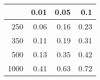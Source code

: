 % 
\begin{tabular}{rrrr}
  \hline
 & 0.01 & 0.05 & 0.1 \\ 
  \hline
250 & 0.06 & 0.16 & 0.23 \\ 
  350 & 0.11 & 0.19 & 0.31 \\ 
  500 & 0.13 & 0.35 & 0.42 \\ 
  1000 & 0.41 & 0.63 & 0.72 \\ 
   \hline
\end{tabular}

